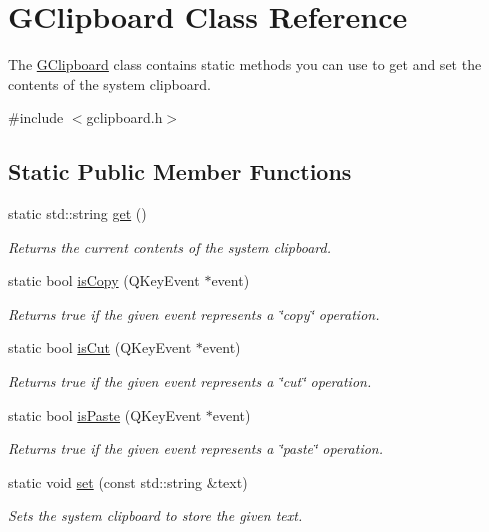 \hypertarget{classGClipboard}{}\section{G\+Clipboard Class Reference}
\label{classGClipboard}


The \mbox{\hyperlink{classGClipboard}{G\+Clipboard}} class contains static methods you can use to get and set the contents of the system clipboard.  




{\ttfamily \#include $<$gclipboard.\+h$>$}

\subsection*{Static Public Member Functions}
\begin{DoxyCompactItemize}
\item 
static std\+::string \mbox{\hyperlink{classGClipboard_a4879b26a87a0b49f7d535c7a669620f6}{get}} ()
\begin{DoxyCompactList}\small\item\em Returns the current contents of the system clipboard. \end{DoxyCompactList}\item 
static bool \mbox{\hyperlink{classGClipboard_a813cbc957e264a1846175ece316757d3}{is\+Copy}} (Q\+Key\+Event $\ast$event)
\begin{DoxyCompactList}\small\item\em Returns true if the given event represents a \char`\"{}copy\char`\"{} operation. \end{DoxyCompactList}\item 
static bool \mbox{\hyperlink{classGClipboard_a5ea46b856cb8eae1295b1e2b7db664aa}{is\+Cut}} (Q\+Key\+Event $\ast$event)
\begin{DoxyCompactList}\small\item\em Returns true if the given event represents a \char`\"{}cut\char`\"{} operation. \end{DoxyCompactList}\item 
static bool \mbox{\hyperlink{classGClipboard_a26e3ab35c80c96117dd4bb455cf38c82}{is\+Paste}} (Q\+Key\+Event $\ast$event)
\begin{DoxyCompactList}\small\item\em Returns true if the given event represents a \char`\"{}paste\char`\"{} operation. \end{DoxyCompactList}\item 
static void \mbox{\hyperlink{classGClipboard_a59ad3e94e40e8ef08c8a69a3a67377df}{set}} (const std\+::string \&text)
\begin{DoxyCompactList}\small\item\em Sets the system clipboard to store the given text. \end{DoxyCompactList}\end{DoxyCompactItemize}


